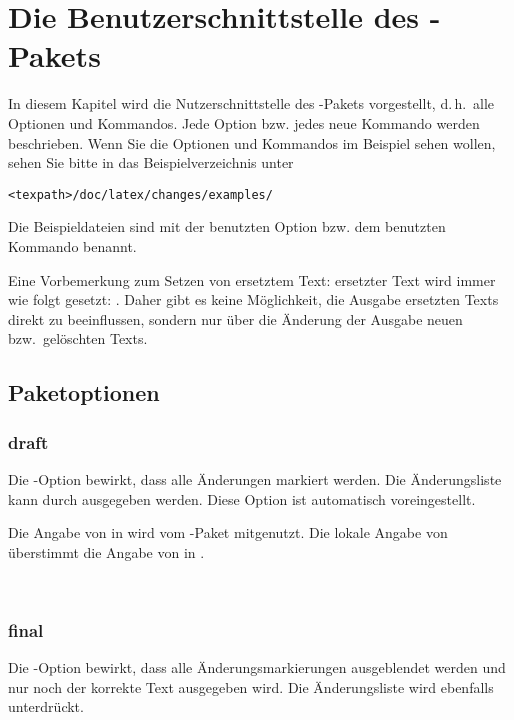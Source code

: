 \section{Die Benutzerschnittstelle des -Pakets}
\label{sec:user}

In diesem Kapitel wird die Nutzerschnittstelle des -Pakets vorgestellt, d.\,h.\ alle Optionen und Kommandos.
Jede Option bzw. jedes neue Kommando werden beschrieben.
Wenn Sie die Optionen und Kommandos im Beispiel sehen wollen, sehen Sie bitte in das Beispielverzeichnis unter

\texttt{<texpath>/doc/latex/changes/examples/}

Die Beispieldateien sind mit der benutzten Option bzw. dem benutzten Kommando benannt.

Eine Vorbemerkung zum Setzen von ersetztem Text: ersetzter Text wird immer wie folgt gesetzt: .
Daher gibt es keine Möglichkeit, die Ausgabe ersetzten Texts direkt zu beeinflussen, sondern nur über die Änderung der Ausgabe neuen bzw.\ gelöschten Texts.

\subsection{Paketoptionen}
\label{sec:user:options}

\subsubsection{draft}

Die -Option bewirkt, dass alle Änderungen markiert werden.
Die Änderungsliste kann durch  ausgegeben werden.
Diese Option ist automatisch voreingestellt.

Die Angabe von  in  wird vom -Paket mitgenutzt.
Die lokale Angabe von  überstimmt die Angabe von  in .

 \Corresponds\ 

\subsubsection{final}

Die -Option bewirkt, dass alle Änderungsmarkierungen ausgeblendet werden und nur noch der korrekte Text ausgegeben wird.
Die Änderungsliste wird ebenfalls unterdrückt.

